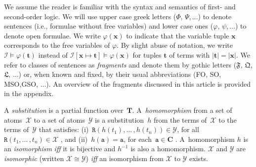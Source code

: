 \documentclass[10pt,a4paper]{amsart}
\theoremstyle{definition}
\numberwithin{equation}{section}
\theoremstyle{plain}
\theoremstyle{definition}
\theoremstyle{myexample}
\theoremstyle{plain}
\theoremstyle{definition}
\renewcommand{\vec}[1]{\boldsymbol{#1}}
\newcommand{\instance}{\mathcal{I}}
\newcommand{\adom}[1]{\fcn{dom}(#1)}
\newcommand{\fcn}[1]{\mathsf{#1}}
\newcommand{\pred}[1]{\mathtt{#1}}
\newcommand{\const}[1]{\mathtt{#1}}
\newcommand{\vx}{\vec{x}}
\newcommand{\vt}{\vec{t}}
\newcommand{\rpred}{\pred{R}}
\newcommand{\iffi}{\textit{iff} } %
\newcommand{\smallldots}{\ldots}
\begin{document}
 We assume the reader is familiar with the syntax and semantics of first- and second-order logic. We will use upper case greek letters ($\Phi$, $\Psi$,$\,\ldots$) to denote sentences (i.e., formulae without free variables) and lower case ones ($\varphi$, $\psi$,$\,\ldots$) to denote open formulae. We write $\varphi(\vx)$ to indicate that the variable tuple $\vx$ corresponds to the free variables of $\varphi$. By slight abuse of notation, we write $\instance \models \varphi(\vt)$ instead of $\instance [\vx \mapsto \vt] \models \varphi(\vx)$ for tuples $\vt$ of terms with $|\vt|=|\vx|$. We refer to classes of sentences as \emph{fragments} and denote them by gothic letters ($\mathfrak{F}$, $\mathfrak{Q}$, $\mathfrak{L}$, $\ldots$) or, when known and fixed, by their usual abbreviations (FO, SO, MSO,\linebreak GSO, $\ldots$). An overview of the fragments discussed in this article is provided in the appendix. %


\renewcommand{\smallldots}{...\,}
\medskip {} A \emph{substitution} is a partial function over~$\mathbf{T}$.
A~\emph{homomorphism} from a set of atoms~$\mathcal{X}$ to a set of 
atoms~$\mathcal{Y}$ is a substitution~$h$ from the terms of~$\mathcal{X}$ to the terms of~$\mathcal{Y}$ that satisfies:
(i)~$\rpred(h(t_1), \smallldots, h(t_n)) \in \mathcal{Y}$, for all~$\rpred(t_1, \smallldots, t_n) \in \mathcal{X}$%
, 
and 
(ii)~$h(\const{a}) = \const{a}$, for each~$\const{a} \in \mathbf{C}$%
. 
A~homomorphism $h$ is an \emph{isomorphism} \iffi it is bijective and $h^{-1}$ is also a homomorphism. $\mathcal{X}$ and $\mathcal{Y}$ are \emph{isomorphic} (written $\mathcal{X} \cong \mathcal{Y}$) \iffi an isomorphism from $\mathcal{X}$ to $\mathcal{Y}$ exists.

\renewcommand{\smallldots}{\ldots}
\end{document}

